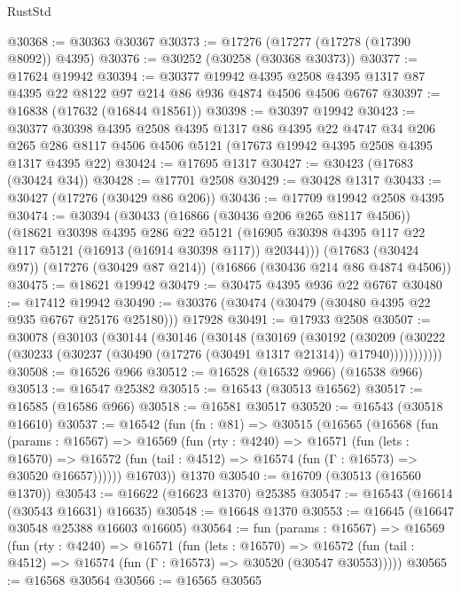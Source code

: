 \begin{lexlean}{RustStd}
\begin{coremodule}
@30368 := @30363 @30367
@30373 := @17276 (@17277 (@17278 (@17390 @8092)) @4395)
@30376 := @30252 (@30258 (@30368 @30373))
@30377 := @17624 @19942
@30394 := @30377
    @19942
    @4395
    @2508
    @4395
    @1317
    @87
    @4395
    @22
    @8122
    @97
    @214
    @86
    @936
    @4874
    @4506
    @4506
    @6767
@30397 := @16838 (@17632 (@16844 @18561))
@30398 := @30397 @19942
@30423 := @30377
    @30398
    @4395
    @2508
    @4395
    @1317
    @86
    @4395
    @22
    @4747
    @34
    @206
    @265
    @286
    @8117
    @4506
    @4506
    @5121
    (@17673 @19942 @4395 @2508 @4395 @1317 @4395 @22)
@30424 := @17695 @1317
@30427 := @30423 (@17683 (@30424 @34))
@30428 := @17701 @2508
@30429 := @30428 @1317
@30433 := @30427 (@17276 (@30429 @86 @206))
@30436 := @17709 @19942 @2508 @4395
@30474 := @30394
    (@30433
      (@16866 (@30436 @206 @265 @8117 @4506))
      (@18621
        @30398
        @4395
        @286
        @22
        @5121
        (@16905 @30398 @4395 @117 @22 @117 @5121 (@16913 (@16914 @30398 @117)) @20344)))
    (@17683 (@30424 @97))
    (@17276 (@30429 @87 @214))
    (@16866 (@30436 @214 @86 @4874 @4506))
@30475 := @18621 @19942
@30479 := @30475 @4395 @936 @22 @6767
@30480 := @17412 @19942
@30490 := @30376 (@30474 (@30479 (@30480 @4395 @22 @935 @6767 @25176 @25180))) @17928
@30491 := @17933 @2508
@30507 := @30078
    (@30103
      (@30144
        (@30146
          (@30148
            (@30169
              (@30192
                (@30209
                  (@30222 (@30233 (@30237 (@30490 (@17276 (@30491 @1317 @21314)) @17940)))))))))))
@30508 := @16526 @966
@30512 := @16528 (@16532 @966) (@16538 @966)
@30513 := @16547 @25382
@30515 := @16543 (@30513 @16562)
@30517 := @16585 (@16586 @966)
@30518 := @16581 @30517
@30520 := @16543 (@30518 @16610)
@30537 := @16542
    (fun (fn : @81) =>
    @30515
      (@16565
        (@16568
          (fun (params : @16567) =>
          @16569
            (fun (rty : @4240) =>
            @16571
              (fun (lets : @16570) =>
              @16572 (fun (tail : @4512) => @16574 (fun (Γ : @16573) => @30520 @16657))))))
        @16703))
    @1370
@30540 := @16709 (@30513 (@16560 @1370))
@30543 := @16622 (@16623 @1370) @25385
@30547 := @16543 (@16614 (@30543 @16631) @16635)
@30548 := @16648 @1370
@30553 := @16645 (@16647 @30548 @25388 @16603 @16605)
@30564 := fun (params : @16567) =>
  @16569
    (fun (rty : @4240) =>
    @16571
      (fun (lets : @16570) =>
      @16572 (fun (tail : @4512) => @16574 (fun (Γ : @16573) => @30520 (@30547 @30553)))))
@30565 := @16568 @30564
@30566 := @16565 @30565

\end{coremodule}
\end{lexlean}
